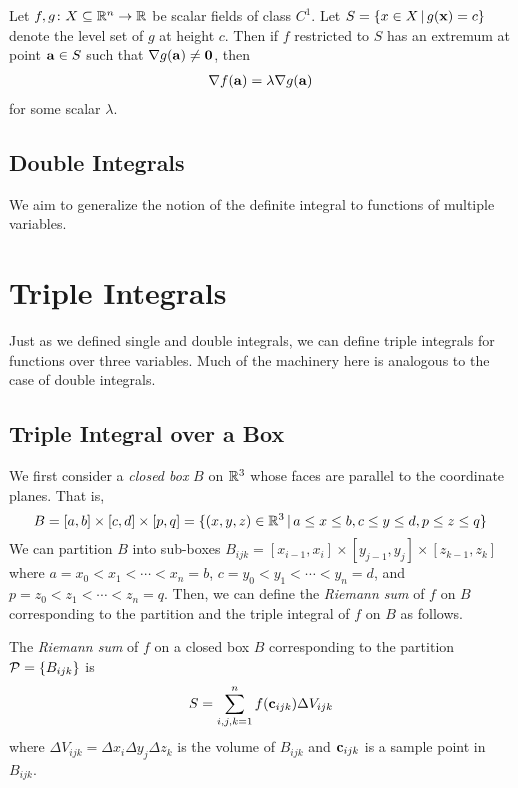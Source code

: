 \documentclass{article}
\begin{document}
\begin{theorem}
  Let $f, g \colon X \subseteq \mathbb{R}^n \to \mathbb{R}$ be scalar fields of class $C^1$.
  Let $S = \{x \in X \,|\, g(\mathbf{x}) = c\}$ denote the level set of $g$ at height $c$.
  Then if $f$ restricted to $S$ has an extremum at point $\mathbf{a} \in S$ such that $\nabla g(\mathbf{a}) \neq \mathbf{0}$, then
  \begin{align}
    \nabla f(\mathbf{a}) = \lambda \nabla g(\mathbf{a})
  \end{align}
  for some scalar $\lambda$.
\end{theorem}

\subsection{Double Integrals}

We aim to generalize the notion of the definite integral to functions of multiple variables.

\section{Triple Integrals}

Just as we defined single and double integrals, we can define triple integrals for functions over three variables.
Much of the machinery here is analogous to the case of double integrals.

\subsection{Triple Integral over a Box}

We first consider a \emph{closed box} $B$ on $\mathbb{R}^3$ whose faces are parallel to the coordinate planes.
That is,
\[
  B = [a, b] \times [c, d] \times [p, q] = \{(x, y, z) \in \mathbb{R}^3 \,|\, a \leq x \leq b, c \leq y \leq d, p \leq z \leq q\}
\]
We can partition $B$ into sub-boxes $B_{ijk} = [x_{i - 1}, x_i] \times [y_{j - 1}, y_j] \times [z_{k - 1}, z_k]$ where $a = x_0 < x_1 < \cdots < x_n = b$, $c = y_0 < y_1 < \cdots < y_n = d$, and $p = z_0 < z_1 < \cdots < z_n = q$.
Then, we can define the \emph{Riemann sum} of $f$ on $B$ corresponding to the partition and the triple integral of $f$ on $B$ as follows.

\begin{definition}
  The \emph{Riemann sum} of $f$ on a closed box $B$ corresponding to the partition $\mathcal{P} = \{B_{ijk}\}$ is
  \[
    S = \sum_{i, j, k = 1}^n f(\mathbf{c}_{ijk}) \Delta V_{ijk}
  \]
  where $\Delta V_{ijk} = \Delta x_i \Delta y_j \Delta z_k$ is the volume of $B_{ijk}$ and $\mathbf{c}_{ijk}$ is a sample point in $B_{ijk}$.
\end{definition}
\end{document}
